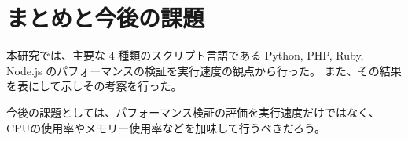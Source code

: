 \chapter{まとめと今後の課題}
\label{cha:conclusion}

 本研究では、主要な 4 種類のスクリプト言語である Python, PHP, Ruby, Node.js のパフォーマンスの検証を実行速度の観点から行った。
 また、その結果を表にして示しその考察を行った。

 今後の課題としては、パフォーマンス検証の評価を実行速度だけではなく、CPUの使用率やメモリー使用率などを加味して行うべきだろう。